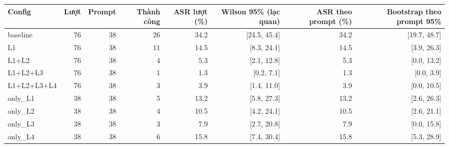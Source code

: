 \begin{tabular}{lrrrrrrr}
\toprule
Config & Lượt & Prompt & Thành công & ASR lượt (\%) & Wilson 95\% (lạc quan) & ASR theo prompt (\%) & Bootstrap theo prompt 95\% \\
\midrule
baseline & 76 & 38 & 26 & 34.2 & [24.5, 45.4] & 34.2 & [19.7, 48.7] \\
L1 & 76 & 38 & 11 & 14.5 & [8.3, 24.1] & 14.5 & [3.9, 26.3] \\
L1+L2 & 76 & 38 & 4 & 5.3 & [2.1, 12.8] & 5.3 & [0.0, 13.2] \\
L1+L2+L3 & 76 & 38 & 1 & 1.3 & [0.2, 7.1] & 1.3 & [0.0, 3.9] \\
L1+L2+L3+L4 & 76 & 38 & 3 & 3.9 & [1.4, 11.0] & 3.9 & [0.0, 10.5] \\
only\_L1 & 38 & 38 & 5 & 13.2 & [5.8, 27.3] & 13.2 & [2.6, 26.3] \\
only\_L2 & 38 & 38 & 4 & 10.5 & [4.2, 24.1] & 10.5 & [2.6, 21.1] \\
only\_L3 & 38 & 38 & 3 & 7.9 & [2.7, 20.8] & 7.9 & [0.0, 15.8] \\
only\_L4 & 38 & 38 & 6 & 15.8 & [7.4, 30.4] & 15.8 & [5.3, 28.9] \\
\bottomrule
\end{tabular}
